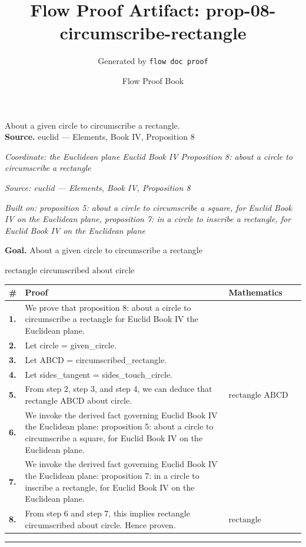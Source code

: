 \documentclass[11pt]{article}
\title{Flow Proof Artifact: prop-08-circumscribe-rectangle}
\author{Generated by \texttt{flow doc proof}}
\date{Flow Proof Book}
\theoremstyle{definition}
\begin{document}
\maketitle
About a given circle to circumscribe a rectangle.\\[0.5em]
\textbf{Source.} euclid — Elements, Book IV, Proposition 8\\[0.5em]
\bigskip
{}\par
\smallskip\noindent\textit{Coordinate: the Euclidean plane \cdot Euclid Book IV \cdot Proposition 8: about a circle to circumscribe a rectangle}\par
\smallskip\noindent\textit{Source: euclid — Elements, Book IV, Proposition 8}\par
\smallskip\noindent\textit{Built on: proposition 5: about a circle to circumscribe a square, for Euclid Book IV on the Euclidean plane, proposition 7: in a circle to inscribe a rectangle, for Euclid Book IV on the Euclidean plane}\par
\medskip
\noindent\textbf{Goal.} About a given circle to circumscribe a rectangle\par
\noindent$\displaystyle \text{rectangle circumscribed about circle}$\par
\medskip
\noindent
\begin{tabular}{@{} >{\raggedright\arraybackslash}p{} >{\raggedright\arraybackslash}p{} >{\raggedleft\arraybackslash}p{} @{}}
\textbf{\#} & \textbf{Proof} & \textbf{Mathematics} \\
\midrule
\textbf{1.} & We prove that proposition 8: about a circle to circumscribe a rectangle for Euclid Book IV the Euclidean plane. & \\[0.45em]
\textbf{2.} & Let circle = given\_circle. & \\[0.45em]
\textbf{3.} & Let ABCD = circumscribed\_rectangle. & \\[0.45em]
\textbf{4.} & Let sides\_tangent = sides\_touch\_circle. & \\[0.45em]
\textbf{5.} & From step 2, step 3, and step 4, we can deduce that rectangle ABCD about circle. & $\displaystyle \text{rectangle ABCD about circle}$ \\[0.45em]
\textbf{6.} & We invoke the derived fact governing Euclid Book IV the Euclidean plane: proposition 5: about a circle to circumscribe a square, for Euclid Book IV on the Euclidean plane. & \\[0.45em]
\textbf{7.} & We invoke the derived fact governing Euclid Book IV the Euclidean plane: proposition 7: in a circle to inscribe a rectangle, for Euclid Book IV on the Euclidean plane. & \\[0.45em]
\textbf{8.} & From step 6 and step 7, this implies rectangle circumscribed about circle. Hence proven. & $\displaystyle \text{rectangle circumscribed about circle}$ \\[0.45em]
\bottomrule
\end{tabular}
\label{thm:Geometry-Euclid Book IV-proposition_8_about_a_circle_to_circumscribe_a_rectangle}
\par\medskip\hrule
\end{document}
